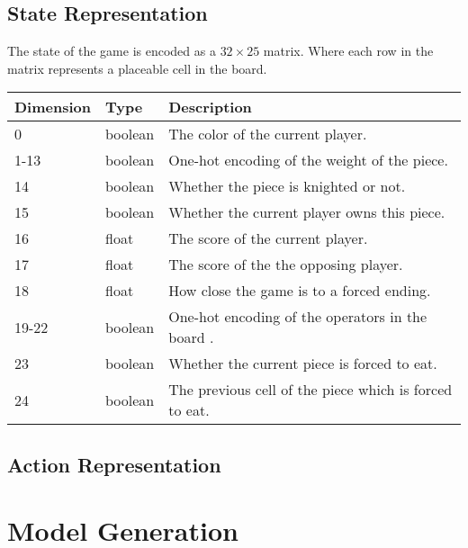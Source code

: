 
\subsection{State Representation}

The state of the game is encoded as a $32 \times 25$ matrix. Where each row in the matrix represents a placeable cell in the board. 

\begin{table}[htb]
  \centering
  \begin{tabular}{|p{2cm} | p{2cm} | p{10cm} |}
    \hline 
    Dimension & Type & Description \\ \hline
    0  &  boolean  & The color of the current player. \\ \hline
    1-13  & boolean &  One-hot encoding of the weight of the piece. \\ \hline
    14 & boolean & Whether the piece is knighted or not. \\ \hline
    15 & boolean & Whether the current player owns this piece. \\ \hline
    16 & float & The score of the current player. \\ \hline
    17 & float & The score of the the opposing player. \\ \hline
    18 & float & How close the game is to a forced ending. \\ \hline
    19-22 & boolean & One-hot encoding of the operators in the board . \\ \hline
    23 & boolean & Whether the current piece is forced to eat. \\ \hline
    24 & boolean & The previous cell of the piece which is forced to eat. \\ \hline
  \end{tabular}
\end{table}



\subsection{Action Representation}



\section{Model Generation}

